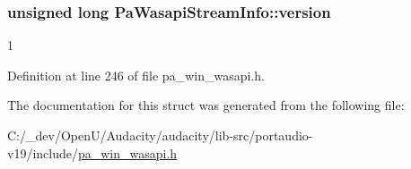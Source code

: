 \subsubsection[{\texorpdfstring{version}{version}}]{\setlength{\rightskip}{0pt plus 5cm}unsigned long Pa\+Wasapi\+Stream\+Info\+::version}\hypertarget{struct_pa_wasapi_stream_info_a3045f4432a92d761e4a1b95eba97ae49}{}\label{struct_pa_wasapi_stream_info_a3045f4432a92d761e4a1b95eba97ae49}
1 

Definition at line 246 of file pa\+\_\+win\+\_\+wasapi.\+h.



The documentation for this struct was generated from the following file\+:\begin{DoxyCompactItemize}
\item 
C\+:/\+\_\+dev/\+Open\+U/\+Audacity/audacity/lib-\/src/portaudio-\/v19/include/\hyperlink{pa__win__wasapi_8h}{pa\+\_\+win\+\_\+wasapi.\+h}\end{DoxyCompactItemize}
